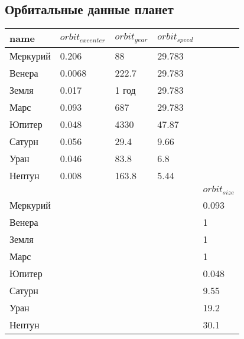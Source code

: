 \documentclass[a4paper,14pt]{extarticle}
\begin{document}
\subsection{Орбитальные данные планет}
\begin{tabular}{|p{2.5cm}|p{2.5cm}|p{2cm}|p{2.5cm}|p{2.5cm}|} \hline

\label{table:questions1}
name & ${ orbit_{excenter}}$ & ${orbit_{year}}$ & ${orbit_{speed}}$ &  \\
\hline
Меркурий & 0.206 & 88 & 29.783 &  \\
Венера & 0.0068 & 222.7 & 29.783 &   \\
Земля & 0.017 & 1 год & 29.783 &  \\
Марс & 0.093 & 687 & 29.783 & \\
Юпитер & 0.048 & 4330 & 47.87 &   \\
Сатурн & 0.056 & 29.4 & 9.66 &   \\
Уран & 0.046 & 83.8 & 6.8 &  \\
Нептун & 0.008 & 163.8 & 5.44 &   \\
\hline
& & &  &  ${orbit_{size}}$\\
Меркурий &  &  & & 0.093 \\
Венера &  & &  & 1  \\
Земля &  &  &  & 1 \\
Марс &  &  &  & 1\\
Юпитер &  &  &  & 0.048  \\
Сатурн &  &  &  & 9.55  \\
Уран &  &  &  & 19.2 \\
Нептун &  &  &  & 30.1  \\
\hline
\end{tabular}
\end{document}
